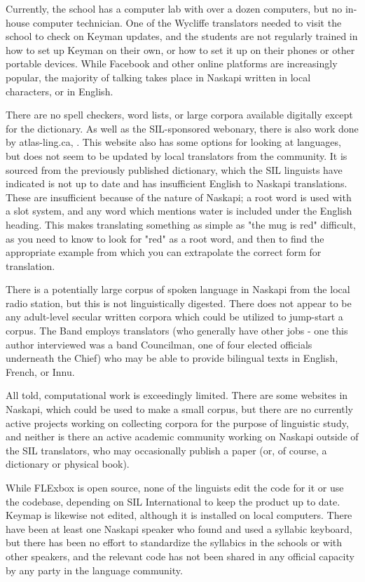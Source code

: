 \documentclass[10pt, a4paper]{article}
\begin{document}
Currently, the school has a computer lab with over a dozen computers, but no in-house computer technician. One of the Wycliffe translators needed to visit the school to check on Keyman updates, and the students are not regularly trained in how to set up Keyman on their own, or how to set it up on their phones or other portable devices. While Facebook and other online platforms are increasingly popular, the majority of talking takes place in Naskapi written in local characters, or in English.

There are no spell checkers, word lists, or large corpora available digitally except for the dictionary. As well as the SIL-sponsored webonary, there is also work done by atlas-ling.ca, .%
This website also has some options for looking at languages, but does not seem to be updated by local translators from the community. It is sourced from the previously published dictionary, which the SIL linguists have indicated is not up to date and has insufficient English to Naskapi translations. These are insufficient because of the nature of Naskapi; a root word is used with a slot system, and any word which mentions water is included under the English heading. This makes translating something as simple as "the mug is red" difficult, as you need to know to look for "red" as a root word, and then to find the appropriate example from which you can extrapolate the correct form for translation.

There is a potentially large corpus of spoken language in Naskapi from the local radio station, but this is not linguistically digested. There does not appear to be any adult-level secular written corpora which could be utilized to jump-start a corpus. The Band employs translators (who generally have other jobs - one this author interviewed was a band Councilman, one of four elected officials underneath the Chief) who may be able to provide bilingual texts in English, French, or Innu.

All told, computational work is exceedingly limited. There are some websites in Naskapi, which could be used to make a small corpus, but there are no currently active projects working on collecting corpora for the purpose of linguistic study, and neither is there an active academic community working on Naskapi outside of the SIL translators, who may occasionally publish a paper (or, of course, a dictionary or physical book).

While FLExbox is open source, none of the linguists edit the code for it or use the codebase, depending on SIL International to keep the product up to date. Keymap is likewise not edited, although it is installed on local computers. There have been at least one Naskapi speaker who found and used a syllabic keyboard, but there has been no effort to standardize the syllabics in the schools or with other speakers, and the relevant code has not been shared in any official capacity by any party in the language community.
\end{document}

